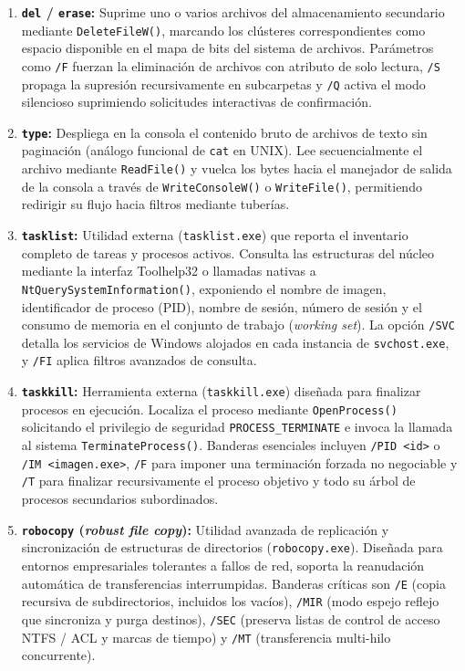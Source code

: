 \documentclass[12pt]{article}
\begin{document}
\begin{enumerate}[noitemsep, topsep=2pt]
    \item \textbf{\texttt{del} / \texttt{erase}:} Suprime uno o varios archivos del almacenamiento secundario mediante \texttt{DeleteFileW()}, marcando los clústeres correspondientes como espacio disponible en el mapa de bits del sistema de archivos. Parámetros como \texttt{/F} fuerzan la eliminación de archivos con atributo de solo lectura, \texttt{/S} propaga la supresión recursivamente en subcarpetas y \texttt{/Q} activa el modo silencioso suprimiendo solicitudes interactivas de confirmación.
    \item \textbf{\texttt{type}:} Despliega en la consola el contenido bruto de archivos de texto sin paginación (análogo funcional de \texttt{cat} en UNIX). Lee secuencialmente el archivo mediante \texttt{ReadFile()} y vuelca los bytes hacia el manejador de salida de la consola a través de \texttt{WriteConsoleW()} o \texttt{WriteFile()}, permitiendo redirigir su flujo hacia filtros mediante tuberías.
    \item \textbf{\texttt{tasklist}:} Utilidad externa (\texttt{tasklist.exe}) que reporta el inventario completo de tareas y procesos activos. Consulta las estructuras del núcleo mediante la interfaz Toolhelp32 o llamadas nativas a \texttt{NtQuerySystemInformation()}, exponiendo el nombre de imagen, identificador de proceso (PID), nombre de sesión, número de sesión y el consumo de memoria en el conjunto de trabajo (\textit{working set}). La opción \texttt{/SVC} detalla los servicios de Windows alojados en cada instancia de \texttt{svchost.exe}, y \texttt{/FI} aplica filtros avanzados de consulta.
    \item \textbf{\texttt{taskkill}:} Herramienta externa (\texttt{taskkill.exe}) diseñada para finalizar procesos en ejecución. Localiza el proceso mediante \texttt{OpenProcess()} solicitando el privilegio de seguridad \texttt{PROCESS\_TERMINATE} e invoca la llamada al sistema \texttt{TerminateProcess()}. Banderas esenciales incluyen \texttt{/PID <id>} o \texttt{/IM <imagen.exe>}, \texttt{/F} para imponer una terminación forzada no negociable y \texttt{/T} para finalizar recursivamente el proceso objetivo y todo su árbol de procesos secundarios subordinados.
    \item \textbf{\texttt{robocopy} (\textit{robust file copy}):} Utilidad avanzada de replicación y sincronización de estructuras de directorios (\texttt{robocopy.exe}). Diseñada para entornos empresariales tolerantes a fallos de red, soporta la reanudación automática de transferencias interrumpidas. Banderas críticas son \texttt{/E} (copia recursiva de subdirectorios, incluidos los vacíos), \texttt{/MIR} (modo espejo reflejo que sincroniza y purga destinos), \texttt{/SEC} (preserva listas de control de acceso NTFS / ACL y marcas de tiempo) y \texttt{/MT} (transferencia multi-hilo concurrente).
\end{enumerate}
\end{document}

